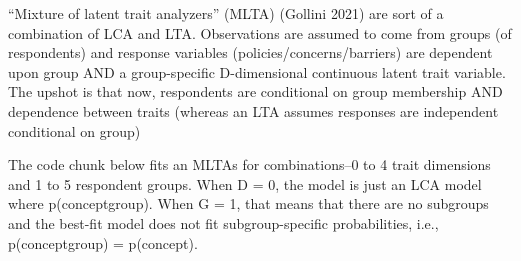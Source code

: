 \documentclass[
]{article}
\begin{document}
``Mixture of latent trait analyzers'' (MLTA) (Gollini 2021) are sort of
a combination of LCA and LTA. Observations are assumed to come from
groups (of respondents) and response variables
(policies/concerns/barriers) are dependent upon group AND a
group-specific D-dimensional continuous latent trait variable. The
upshot is that now, respondents are conditional on group membership AND
dependence between traits (whereas an LTA assumes responses are
independent conditional on group)

The code chunk below fits an MLTAs for combinations--0 to 4 trait
dimensions and 1 to 5 respondent groups. When D = 0, the model is just
an LCA model where p(concept\textbar group). When G = 1, that means that
there are no subgroups and the best-fit model does not fit
subgroup-specific probabilities, i.e., p(concept\textbar group) =
p(concept).
\end{document}
